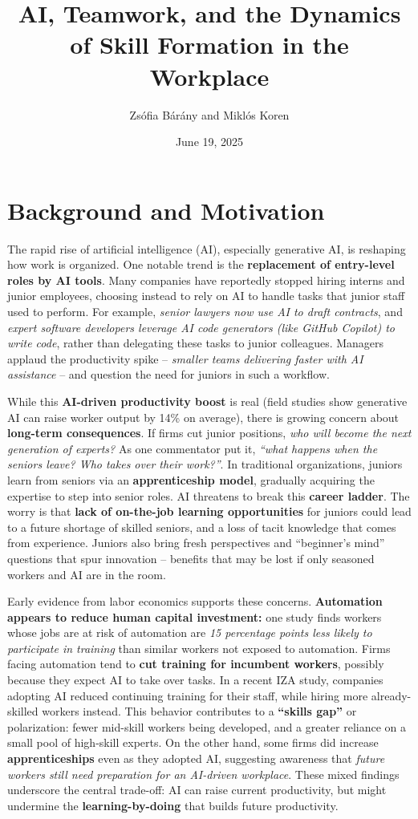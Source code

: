 \documentclass[12pt]{article}
\title{AI, Teamwork, and the Dynamics of Skill Formation in the Workplace}
\author{Zsófia Bárány and Miklós Koren}
\date{June 19, 2025}
\begin{document}
\maketitle
\section{Background and Motivation}\label{background-and-motivation}

The rapid rise of artificial intelligence (AI), especially generative
AI, is reshaping how work is organized. One notable trend is the
\textbf{replacement of entry-level roles by AI tools}. Many companies
have reportedly stopped hiring interns and junior employees, choosing
instead to rely on AI to handle tasks that junior staff used to perform.
For example, \emph{senior lawyers now use AI to draft contracts}, and
\emph{expert software developers leverage AI code generators (like
GitHub Copilot) to write code}, rather than delegating these tasks to
junior colleagues. Managers applaud the productivity spike --
\emph{smaller teams delivering faster with AI assistance} -- and
question the need for juniors in such a workflow.

While this \textbf{AI-driven productivity boost} is real (field studies
show generative AI can raise worker output by 14\% on average), there is
growing concern about \textbf{long-term consequences}. If firms cut
junior positions, \emph{who will become the next generation of experts?}
As one commentator put it, \emph{``what happens when the seniors leave?
Who takes over their work?''}. In traditional organizations, juniors
learn from seniors via an \textbf{apprenticeship model}, gradually
acquiring the expertise to step into senior roles. AI threatens to break
this \textbf{career ladder}. The worry is that \textbf{lack of
on-the-job learning opportunities} for juniors could lead to a future
shortage of skilled seniors, and a loss of tacit knowledge that comes
from experience. Juniors also bring fresh perspectives and ``beginner's
mind'' questions that spur innovation -- benefits that may be lost if
only seasoned workers and AI are in the room.

Early evidence from labor economics supports these concerns.
\textbf{Automation appears to reduce human capital investment:} one
study finds workers whose jobs are at risk of automation are \emph{15
percentage points less likely to participate in training} than similar
workers not exposed to automation. Firms facing automation tend to
\textbf{cut training for incumbent workers}, possibly because they
expect AI to take over tasks. In a recent IZA study, companies adopting
AI reduced continuing training for their staff, while hiring more
already-skilled workers instead. This behavior contributes to a
\textbf{``skills gap''} or polarization: fewer mid-skill workers being
developed, and a greater reliance on a small pool of high-skill experts.
On the other hand, some firms did increase \textbf{apprenticeships} even
as they adopted AI, suggesting awareness that \emph{future workers still
need preparation for an AI-driven workplace}. These mixed findings
underscore the central trade-off: AI can raise current productivity, but
might undermine the \textbf{learning-by-doing} that builds future
productivity.
\end{document}
